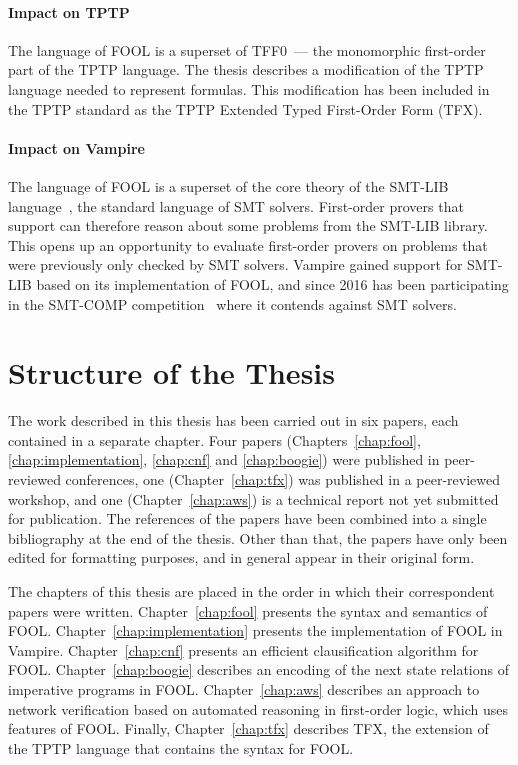 \paragraph{Impact on TPTP}
The language of FOOL is a superset of TFF0~--- the monomorphic first-order part of the TPTP language. The thesis describes a modification of the TPTP language needed to represent \folb{} formulas. This modification has been included in the TPTP standard as the TPTP Extended Typed First-Order Form (TFX).

\paragraph{Impact on Vampire}
The language of FOOL is a superset of the core theory of the SMT-LIB language~\cite{SMT-LIB}, the standard language of SMT solvers. First-order provers that support \folb{} can therefore reason about some problems from the SMT-LIB library. This opens up an opportunity to evaluate first-order provers on problems that were previously only checked by SMT solvers. Vampire gained support for SMT-LIB based on its implementation of FOOL, and since 2016 has been participating in the SMT-COMP competition~\cite{DBLP:conf/cav/BarrettMS05} where it contends against SMT solvers.

\section*{Structure of the Thesis}
\label{sect:intro:overview}

The work described in this thesis has been carried out in six papers, each contained in a separate chapter. Four papers (Chapters~\ref{chap:fool}, \ref{chap:implementation}, \ref{chap:cnf} and \ref{chap:boogie}) were published in peer-reviewed conferences, one (Chapter~\ref{chap:tfx}) was published in a peer-reviewed workshop, and one (Chapter~\ref{chap:aws}) is a technical report not yet submitted for publication. The references of the papers have been combined into a single bibliography at the end of the thesis. Other than that, the papers have only been edited for formatting purposes, and in general appear in their original form.

The chapters of this thesis are placed in the order in which their correspondent papers were written. Chapter~\ref{chap:fool} presents the syntax and semantics of FOOL. Chapter~\ref{chap:implementation} presents the implementation of FOOL in Vampire. Chapter~\ref{chap:cnf} presents an efficient clausification algorithm for FOOL. Chapter~\ref{chap:boogie} describes an encoding of the next state relations of imperative programs in FOOL. Chapter~\ref{chap:aws} describes an approach to network verification based on automated reasoning in first-order logic, which uses features of FOOL. Finally, Chapter~\ref{chap:tfx} describes TFX, the extension of the TPTP language that contains the syntax for FOOL.

